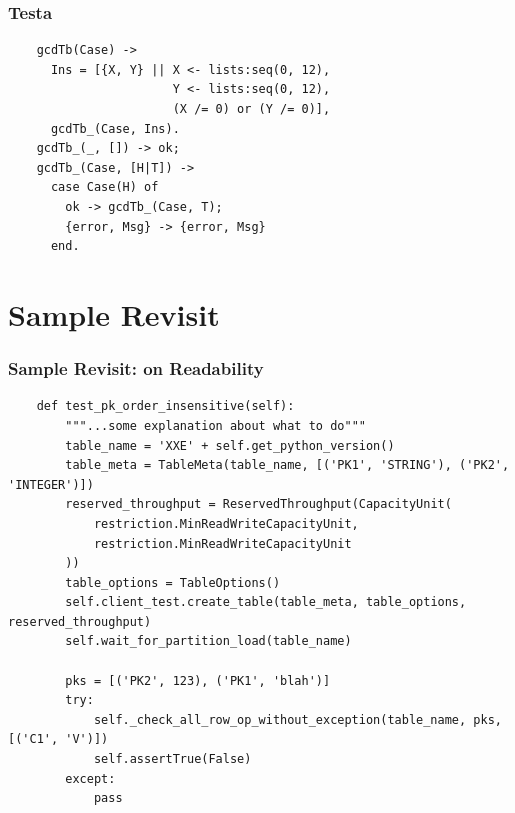 \documentclass[lualatex]{beamer}
\begin{document}
\begin{frame}[fragile]
  \frametitle{Testa}

  \begin{verbatim}
    gcdTb(Case) ->
      Ins = [{X, Y} || X <- lists:seq(0, 12),
                       Y <- lists:seq(0, 12),
                       (X /= 0) or (Y /= 0)],
      gcdTb_(Case, Ins).
    gcdTb_(_, []) -> ok;
    gcdTb_(Case, [H|T]) -> 
      case Case(H) of
        ok -> gcdTb_(Case, T);
        {error, Msg} -> {error, Msg}
      end.
  \end{verbatim}
\end{frame}

\section{Sample Revisit}

\begin{frame}[fragile]
  \frametitle{Sample Revisit: on Readability}

  \begin{verbatim}
    def test_pk_order_insensitive(self):
        """...some explanation about what to do"""
        table_name = 'XXE' + self.get_python_version()
        table_meta = TableMeta(table_name, [('PK1', 'STRING'), ('PK2', 'INTEGER')])
        reserved_throughput = ReservedThroughput(CapacityUnit(
            restriction.MinReadWriteCapacityUnit,
            restriction.MinReadWriteCapacityUnit
        ))
        table_options = TableOptions()
        self.client_test.create_table(table_meta, table_options, reserved_throughput)
        self.wait_for_partition_load(table_name)
 
        pks = [('PK2', 123), ('PK1', 'blah')]
        try:
            self._check_all_row_op_without_exception(table_name, pks, [('C1', 'V')])
            self.assertTrue(False)
        except:
            pass
  \end{verbatim}
\end{frame}
\end{document}
